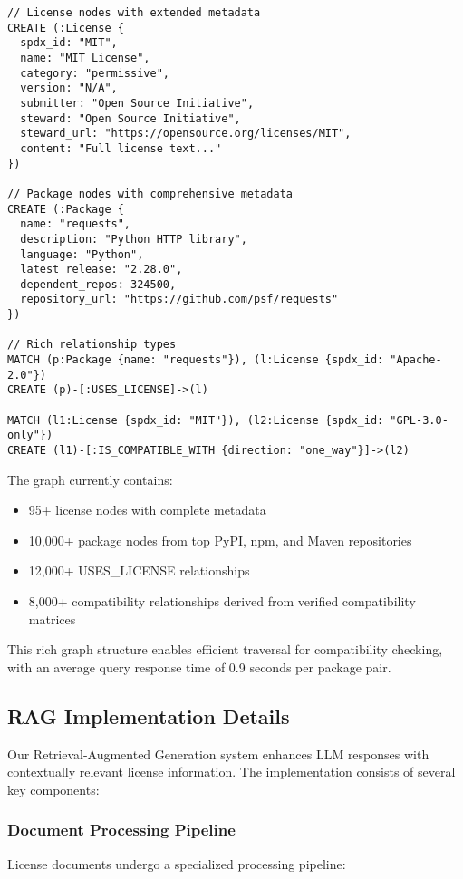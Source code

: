 \documentclass[12pt]{article}
\begin{document}
\begin{lstlisting}[language=Cypher, caption=Enhanced Neo4j Schema for License Knowledge Graph]
// License nodes with extended metadata
CREATE (:License {
  spdx_id: "MIT",
  name: "MIT License",
  category: "permissive",
  version: "N/A",
  submitter: "Open Source Initiative",
  steward: "Open Source Initiative",
  steward_url: "https://opensource.org/licenses/MIT",
  content: "Full license text..."
})

// Package nodes with comprehensive metadata
CREATE (:Package {
  name: "requests",
  description: "Python HTTP library",
  language: "Python",
  latest_release: "2.28.0",
  dependent_repos: 324500,
  repository_url: "https://github.com/psf/requests"
})

// Rich relationship types
MATCH (p:Package {name: "requests"}), (l:License {spdx_id: "Apache-2.0"})
CREATE (p)-[:USES_LICENSE]->(l)

MATCH (l1:License {spdx_id: "MIT"}), (l2:License {spdx_id: "GPL-3.0-only"})
CREATE (l1)-[:IS_COMPATIBLE_WITH {direction: "one_way"}]->(l2)
\end{lstlisting}

The graph currently contains:
\begin{itemize}
    \item 95+ license nodes with complete metadata
    \item 10,000+ package nodes from top PyPI, npm, and Maven repositories
    \item 12,000+ USES\_LICENSE relationships
    \item 8,000+ compatibility relationships derived from verified compatibility matrices
\end{itemize}

This rich graph structure enables efficient traversal for compatibility checking, with an average query response time of 0.9 seconds per package pair.

\subsection{RAG Implementation Details}
\label{sec:rag_implementation}

Our Retrieval-Augmented Generation system enhances LLM responses with contextually relevant license information. The implementation consists of several key components:

\subsubsection{Document Processing Pipeline}
License documents undergo a specialized processing pipeline:
\end{document}
